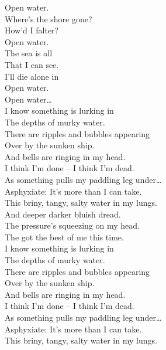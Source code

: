 Open water. \\
Where's the shore gone? \\
How'd I falter? \\
Open water. \\

The sea is all \\
That I can see. \\
I'll die alone in \\
Open water. \\

Open water… \\

I know something is lurking in \\
The depths of murky water. \\
There are ripples and bubbles appearing \\
Over by the sunken ship. \\

And bells are ringing in my head. \\
I think I'm done -- I think I'm dead. \\
As something pulls my paddling leg under… \\

Asphyxiate: It's more than I can take. \\
This briny, tangy, salty water in my lungs. \\

And deeper darker bluish dread. \\
The pressure's squeezing on my head. \\
The  got the best of me this time. \\

I know something is lurking in \\
The depths of murky water. \\
There are ripples and bubbles appearing \\
Over by the sunken ship. \\

And bells are ringing in my head. \\
I think I'm done -- I think I'm dead. \\
As something pulls my paddling leg under… \\

Asphyxiate: It's more than I can take. \\
This briny, tangy, salty water in my lungs. \\

